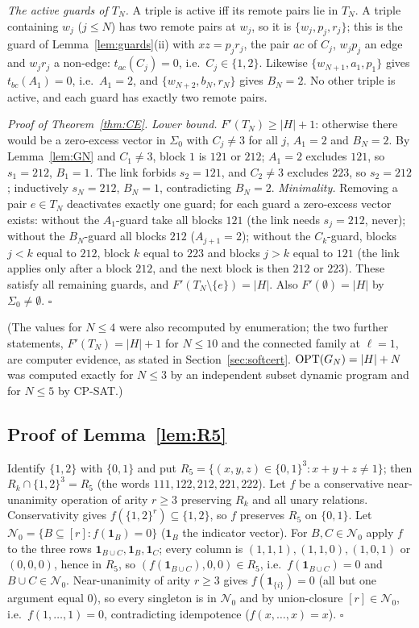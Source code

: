 \emph{The active guards of $T_N$.} A triple is active iff its remote pairs lie in $T_N$. A triple containing $w_j$ ($j\le N$) has two remote pairs at $w_j$, so it is $\{w_j,p_j,r_j\}$; this is the guard of Lemma~\ref{lem:guards}(ii) with $xz=p_jr_j$, the pair $ac$ of $C_j$, $w_jp_j$ an edge and $w_jr_j$ a non-edge: $t_{ac}(C_j)=0$, i.e.\ $C_j\in\{1,2\}$. Likewise $\{w_{N+1},a_1,p_1\}$ gives $t_{bc}(A_1)=0$, i.e.\ $A_1=2$, and $\{w_{N+2},b_N,r_N\}$ gives $B_N=2$. No other triple is active, and each guard has exactly two remote pairs.

\emph{Proof of Theorem~\ref{thm:CE}.} \emph{Lower bound.} $F'(T_N)\ge|H|+1$: otherwise there would be a zero-excess vector in $\Sigma_0$ with $C_j\ne3$ for all $j$, $A_1=2$ and $B_N=2$. By Lemma~\ref{lem:GN} and $C_1\ne3$, block $1$ is $121$ or $212$; $A_1=2$ excludes $121$, so $s_1=212$, $B_1=1$. The link forbids $s_2=121$, and $C_2\ne3$ excludes $223$, so $s_2=212$; inductively $s_N=212$, $B_N=1$, contradicting $B_N=2$. \emph{Minimality.} Removing a pair $e\in T_N$ deactivates exactly one guard; for each guard a zero-excess vector exists: without the $A_1$-guard take all blocks $121$ (the link needs $s_j=212$, never); without the $B_N$-guard all blocks $212$ ($A_{j+1}=2$); without the $C_k$-guard, blocks $j<k$ equal to $212$, block $k$ equal to $223$ and blocks $j>k$ equal to $121$ (the link applies only after a block $212$, and the next block is then $212$ or $223$). These satisfy all remaining guards, and $F'(T_N\setminus\{e\})=|H|$. Also $F'(\emptyset)=|H|$ by $\Sigma_0\ne\emptyset$. \hfill$\square$

(The values for $N\le4$ were also recomputed by enumeration; the two further statements, $F'(T_N)=|H|+1$ for $N\le10$ and the connected family at $\ell=1$, are computer evidence, as stated in Section~\ref{sec:softcert}. $\mathrm{OPT}(G_N)=|H|+N$ was computed exactly for $N\le3$ by an independent subset dynamic program and for $N\le5$ by CP-SAT.)

\subsection{Proof of Lemma~\ref{lem:R5}}\label{app:softR5}
Identify $\{1,2\}$ with $\{0,1\}$ and put $R_5=\{(x,y,z)\in\{0,1\}^3:x+y+z\ne1\}$; then $R_k\cap\{1,2\}^3=R_5$ (the words $111,122,212,221,222$). Let $f$ be a conservative near-unanimity operation of arity $r\ge3$ preserving $R_k$ and all unary relations. Conservativity gives $f(\{1,2\}^r)\subseteq\{1,2\}$, so $f$ preserves $R_5$ on $\{0,1\}$. Let $\mathcal N_0=\{B\subseteq[r]:f(\mathbf 1_B)=0\}$ ($\mathbf 1_B$ the indicator vector). For $B,C\in\mathcal N_0$ apply $f$ to the three rows $\mathbf 1_{B\cup C},\mathbf 1_B,\mathbf 1_C$; every column is $(1,1,1),(1,1,0),(1,0,1)$ or $(0,0,0)$, hence in $R_5$, so $(f(\mathbf 1_{B\cup C}),0,0)\in R_5$, i.e.\ $f(\mathbf 1_{B\cup C})=0$ and $B\cup C\in\mathcal N_0$. Near-unanimity of arity $r\ge3$ gives $f(\mathbf 1_{\{i\}})=0$ (all but one argument equal $0$), so every singleton is in $\mathcal N_0$ and by union-closure $[r]\in\mathcal N_0$, i.e.\ $f(1,\dots,1)=0$, contradicting idempotence ($f(x,\dots,x)=x$). \hfill$\square$

